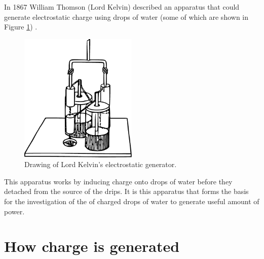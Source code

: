 
In 1867 William Thomson (Lord Kelvin) described an apparatus that
could generate electrostatic charge using drops of water (some of
which are shown in Figure \ref{Figure_Drawing_KelvinWaterDripper_OriginalDevice})
\cite{Thomson1867}.

\begin{figure}
    \centering
    \includegraphics[width=0.5\textwidth]{content/appendices/chargedWaterDrops/graphics/Figure_Drawing_KelvinWaterDripper_OriginalDevice}
    \caption{Drawing of Lord Kelvin's electrostatic generator.}
    \label{Figure_Drawing_KelvinWaterDripper_OriginalDevice}
\end{figure}

This apparatus works by inducing charge onto drops of water before
they detached from the source of the drips. It is this apparatus that
forms the basis for the investigation of the of charged drops of water
to generate useful amount of power.


\section{How charge is generated}


